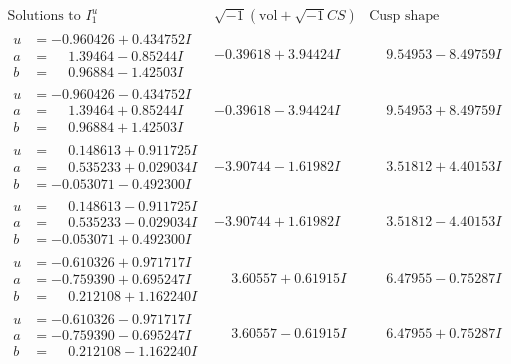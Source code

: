 \documentclass[1p]{elsarticle_modified}
\theoremstyle{definition}
\newcommand{\I}{\sqrt{-1}}
\begin{document}
$$\begin{array}{c|c|c}  
\text{Solutions to }I^u_{1}& \I (\text{vol} + \sqrt{-1}CS) & \text{Cusp shape}\\
 \hline 
\begin{aligned}
u &= -0.960426 + 0.434752 I \\
a &= \phantom{-}1.39464 - 0.85244 I \\
b &= \phantom{-}0.96884 - 1.42503 I\end{aligned}
 & -0.39618 + 3.94424 I & \phantom{-}9.54953 - 8.49759 I \\ \hline\begin{aligned}
u &= -0.960426 - 0.434752 I \\
a &= \phantom{-}1.39464 + 0.85244 I \\
b &= \phantom{-}0.96884 + 1.42503 I\end{aligned}
 & -0.39618 - 3.94424 I & \phantom{-}9.54953 + 8.49759 I \\ \hline\begin{aligned}
u &= \phantom{-}0.148613 + 0.911725 I \\
a &= \phantom{-}0.535233 + 0.029034 I \\
b &= -0.053071 - 0.492300 I\end{aligned}
 & -3.90744 - 1.61982 I & \phantom{-}3.51812 + 4.40153 I \\ \hline\begin{aligned}
u &= \phantom{-}0.148613 - 0.911725 I \\
a &= \phantom{-}0.535233 - 0.029034 I \\
b &= -0.053071 + 0.492300 I\end{aligned}
 & -3.90744 + 1.61982 I & \phantom{-}3.51812 - 4.40153 I \\ \hline\begin{aligned}
u &= -0.610326 + 0.971717 I \\
a &= -0.759390 + 0.695247 I \\
b &= \phantom{-}0.212108 + 1.162240 I\end{aligned}
 & \phantom{-}3.60557 + 0.61915 I & \phantom{-}6.47955 - 0.75287 I \\ \hline\begin{aligned}
u &= -0.610326 - 0.971717 I \\
a &= -0.759390 - 0.695247 I \\
b &= \phantom{-}0.212108 - 1.162240 I\end{aligned}
 & \phantom{-}3.60557 - 0.61915 I & \phantom{-}6.47955 + 0.75287 I \\ \hline\begin{aligned}

\end{aligned}
\end{array}$$
\end{document}
